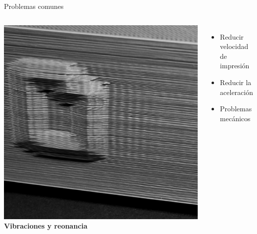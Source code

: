 \documentclass{beamer}
\begin{document}
	\begin{frame}{Problemas comunes}
		\begin{columns}
				\includegraphics[width=\textwidth]{images/Vibrations-And-Ringing}
				\textbf{Vibraciones y reonancia}
				\begin{itemize}
					\item Reducir velocidad de impresión
					\item Reducir la aceleración
					\item Problemas mecánicos
				\end{itemize}
		\end{columns}
	\end{frame}
\end{document}
